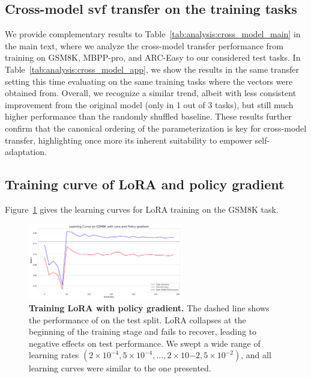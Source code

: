 \subsection{Cross-model svf transfer on the training tasks}
We provide complementary results to Table~\ref{tab:analysis:cross_model_main} in the main text, where we analyze the \svdacro cross-model transfer performance from training on GSM8K, MBPP-pro, and ARC-Easy to our considered test tasks. In Table~\ref{tab:analysis:cross_model_app}, we show the results in the same transfer setting this time evaluating \mistral on the same training tasks where the \llama \svdacro vectors were obtained from. Overall, we recognize a similar trend, albeit with less consistent improvement from the original model (only in 1 out of 3 tasks), but still much higher performance than the randomly shuffled baseline. These results further confirm that the canonical ordering of the \svdacro parameterization is key for cross-model transfer, highlighting once more its inherent suitability to empower self-adaptation.



\subsection{Training curve of LoRA and policy gradient}

Figure~\ref{app:fig:lora_learning_curves} gives the learning curves for LoRA training on the GSM8K task.

\begin{figure}[h]
    \centering
    \includegraphics[width=0.6\textwidth]{images/lora_training_curve.pdf}
    \caption{\textbf{Training LoRA with policy gradient.} The dashed line shows the performance of \llama on the test split. LoRA collapses at the beginning of the training stage and fails to recover, leading to negative effects on test performance. We swept a wide range of learning rates $(2 \times 10^{-4}, 5 \times 10^{-4}, \dots, 2\times 10{-2}, 5\times 10^{-2})$, and all learning curves were similar to the one presented.}
    \label{app:fig:lora_learning_curves}
\end{figure}
